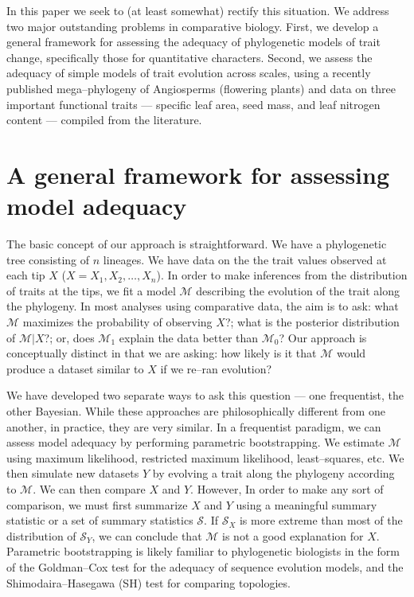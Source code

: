 \documentclass[a4paper,12pt]{article}
\begin{document}
In this paper we seek to (at least somewhat) rectify this situation. We address two major outstanding problems in comparative biology. First, we develop a general framework for assessing the adequacy of phylogenetic models of trait change, specifically those for quantitative characters. Second, we assess the adequacy of simple models of trait evolution across scales, using a recently published mega--phylogeny of Angiosperms (flowering plants) \citep{Zanne2013} and data on three important functional traits --- specific leaf area, seed mass, and leaf nitrogen content --- compiled from the literature. 

\section{A general framework for assessing model adequacy}
The basic concept of our approach is straightforward. We have a phylogenetic tree consisting of $n$ lineages. We have data on the the trait values observed at each tip $X$ ($X= X_1, X_2, \ldots, X_n$). In order to make inferences from the distribution of traits at the tips, we fit a model $\mathcal{M}$ describing the evolution of the trait along the phylogeny. In most analyses using comparative data, the aim is to ask: what $\mathcal{M}$ maximizes the probability of observing $X$?; what is the posterior distribution of $\mathcal{M}|X$?; or, does $\mathcal{M}_1$ explain the data better than $\mathcal{M}_0$? Our approach is conceptually distinct in that we are asking: how likely is it that $\mathcal{M}$ would produce a dataset similar to $X$ if we re--ran evolution?

We have developed two separate ways to ask this question --- one frequentist, the other Bayesian. While these approaches are philosophically different from one another, in practice, they are very similar. In a frequentist paradigm, we can assess model adequacy by performing parametric bootstrapping. We estimate $\mathcal{M}$ using maximum likelihood, restricted maximum likelihood, least--squares, etc. We then simulate new datasets $Y$ by evolving a trait along the phylogeny according to $\mathcal{M}$. We can then compare $X$ and $Y$. However, In order to make any sort of comparison, we must first summarize $X$ and $Y$ using a meaningful summary statistic or a set of summary statistics $\mathcal{S}$. If $\mathcal{S}_X$ is more extreme than most of the distribution of $\mathcal{S}_Y$, we can conclude that $\mathcal{M}$ is not a good explanation for $X$. Parametric bootstrapping is likely familiar to phylogenetic biologists in the form of the Goldman--Cox test \citep{Goldman} for the adequacy of sequence evolution models, and the Shimodaira--Hasegawa (SH) test \citep{SH} for comparing topologies. 
\end{document}
